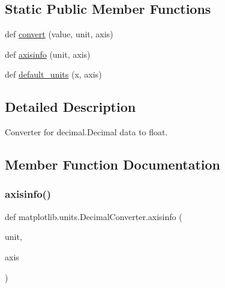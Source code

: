 \subsection*{Static Public Member Functions}
\begin{DoxyCompactItemize}
\item 
def \hyperlink{classmatplotlib_1_1units_1_1DecimalConverter_a13553906ea66d3300bf389e6c2737771}{convert} (value, unit, axis)
\item 
def \hyperlink{classmatplotlib_1_1units_1_1DecimalConverter_a532257f153fc2863bcd6ffd53b1b3fb5}{axisinfo} (unit, axis)
\item 
def \hyperlink{classmatplotlib_1_1units_1_1DecimalConverter_a2930558bb899f089d2cf495ddb37c2c5}{default\+\_\+units} (x, axis)
\end{DoxyCompactItemize}


\subsection{Detailed Description}
\begin{DoxyVerb}Converter for decimal.Decimal data to float.\end{DoxyVerb}
 

\subsection{Member Function Documentation}
\mbox{\label{classmatplotlib_1_1units_1_1DecimalConverter_a532257f153fc2863bcd6ffd53b1b3fb5}} 
\subsubsection{\texorpdfstring{axisinfo()}{axisinfo()}}
{\footnotesize\ttfamily def matplotlib.\+units.\+Decimal\+Converter.\+axisinfo (\begin{DoxyParamCaption}\item[{}]{unit,  }\item[{}]{axis }\end{DoxyParamCaption})\hspace{0.3cm}{\ttfamily [static]}}

\mbox{\label{classmatplotlib_1_1units_1_1DecimalConverter_a13553906ea66d3300bf389e6c2737771}} 

